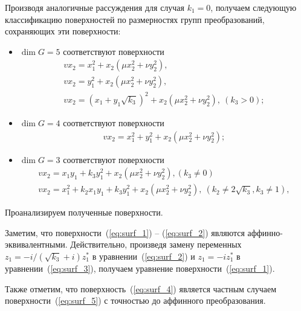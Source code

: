 \documentclass[../main.tex]{subfiles}
\begin{document}
Производя аналогичные рассуждения для случая $k_1 = 0$, получаем следующую классификацию поверхностей по размерностях групп преобразований, сохраняющих эти поверхности:
\begin{itemize}
\item $\dim G = 5$ соответствуют поверхности
\begin{gather}
	v x_2 = x_1^2 + x_2 (\mu x_2^2 + \nu y_2^2),\label{eq:surf_1} \\
	v x_2 = y_1^2 + x_2 (\mu x_2^2 + \nu y_2^2),\label{eq:surf_3} \\
	v x_2 = (x_1 + y_1 \sqrt{k_3})^2 + x_2 (\mu x_2^2 + \nu y_2^2),~(k_3 > 0);\label{eq:surf_2}
\end{gather}
\item $\dim G = 4$ соответствуют поверхности
\begin{gather}
	v x_2 = x_1^2 + y_1^2 + x_2 (\mu x_2^2 + \nu y_2^2);
\end{gather}
\item $\dim G = 3$ соответствуют поверхности
\begin{gather}
	v x_2 = x_1 y_1 + k_3 y_1 ^2 + x_2 (\mu x_2^2 + \nu y_2^2),(k_3 \ne 0)\label{eq:surf_4}\\
	v x_2 = x_1^2 + k_2 x_1 y_1 + k_3 y_1^2 + x_2 (\mu x_2^2 + \nu y_2^2),~(k_2 \ne 2\sqrt{k_3}, k_3 \ne 1),\label{eq:surf_5}
\end{gather}
\end{itemize}
Проанализируем полученные поверхности.

Заметим, что поверхности~(\ref{eq:surf_1}) -- (\ref{eq:surf_2}) являются аффинно- эквивалентными. Действительно, произведя замену переменных $z_1 = -i/(\sqrt{k_3}+i)z^*_1$ в уравнении~(\ref{eq:surf_2}) и $z_1 = -i z^*_1$ в уравнении~(\ref{eq:surf_3}), получаем уравнение поверхности~(\ref{eq:surf_1}).

Также отметим, что поверхность~(\ref{eq:surf_4}) является частным случаем поверхности~(\ref{eq:surf_5}) с точностью до аффинного преобразования.
\end{document}
